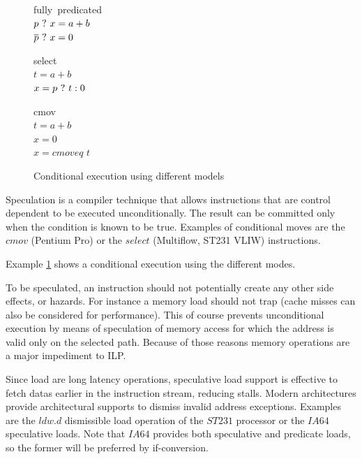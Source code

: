 \begin{figure}
\footnotesize
\begin{minipage}[t]{3cm}
\mbox{fully predicated} \\
$p ~?~ x = a + b $ \\
$\overline{p} ~?~ x = 0 $ \\
\end{minipage} 
\begin{minipage}[t]{3cm}
\mbox{select} \\
$t = a + b $ \\
$x= p ~?~ t : 0 $ \\
\end{minipage}
\begin{minipage}[t]{3cm}
\mbox{cmov} \\
$t = a + b $ \\
$x = 0 $ \\
$x = cmoveq$ $t$ \\
\end{minipage}
\caption{Conditional execution using different models}
\label{fig:pred}
\end{figure}

Speculation is a compiler technique that allows instructions that are control dependent to be executed unconditionally. The result can be committed only when the condition is known to be true. Examples of conditional moves are the $cmov$ (Pentium Pro) or the $select$ (Multiflow, ST231 VLIW) instructions.

Example \ref{fig:pred} shows a conditional execution using the different modes.

To be speculated, an instruction should not potentially create any other side effects, or hazards. For instance a memory load should not trap (cache misses can also be considered for performance). This of course prevents unconditional execution by means of speculation of memory access for which the address is valid only on the selected path. Because of those reasons memory operations are a major impediment to ILP. 

Since load are long latency operations, speculative load support is effective to fetch datas earlier in the instruction stream, reducing stalls. Modern architectures provide architectural supports to dismiss invalid address exceptions. Examples are the $ldw.d$ dismissible load operation of the $ST231$ processor or the $IA64$ speculative loads. Note that $IA64$ provides both speculative and predicate loads, so the former will be preferred by if-conversion. 

